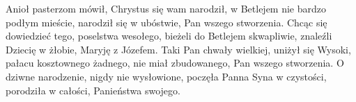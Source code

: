 \beginverse
Anioł pasterzom mówił,
Chrystus się wam narodził,
w Betlejem nie bardzo podłym mieście,
narodził się w ubóstwie,
Pan wszego stworzenia.
\endverse
\beginverse
Chcąc się dowiedzieć tego,
poselstwa wesołego,
bieżeli do Betlejem skwapliwie,
znaleźli Dziecię w żłobie,
Maryję z Józefem.
\endverse
\beginverse
Taki Pan chwały wielkiej,
uniżył się Wysoki,
pałacu kosztownego żadnego,
nie miał zbudowanego,
Pan wszego stworzenia.
\endverse
\beginverse
O dziwne narodzenie,
nigdy nie wysłowione,
poczęła Panna Syna w czystości,
porodziła w całości,
Panieństwa swojego.
\endverse
\endsong